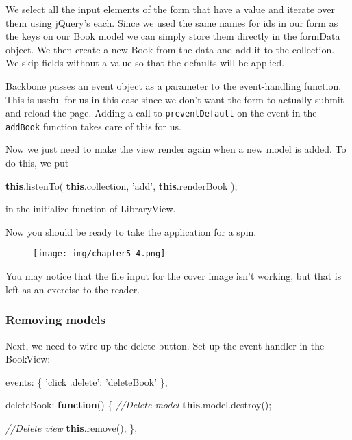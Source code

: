\documentclass[9pt]{book}
\newenvironment{Shaded}{}{}
\newcommand{\KeywordTok}[1]{\textcolor[rgb]{0.00,0.44,0.13}{\textbf{{#1}}}}
\newcommand{\StringTok}[1]{\textcolor[rgb]{0.25,0.44,0.63}{{#1}}}
\newcommand{\CommentTok}[1]{\textcolor[rgb]{0.38,0.63,0.69}{\textit{{#1}}}}
\newcommand{\OtherTok}[1]{\textcolor[rgb]{0.00,0.44,0.13}{{#1}}}
\newcommand{\FunctionTok}[1]{\textcolor[rgb]{0.02,0.16,0.49}{{#1}}}
\newcommand{\NormalTok}[1]{{#1}}
\begin{document}
We select all the input elements of the form that have a value and
iterate over them using jQuery's each. Since we used the same names for
ids in our form as the keys on our Book model we can simply store them
directly in the formData object. We then create a new Book from the data
and add it to the collection. We skip fields without a value so that the
defaults will be applied.

Backbone passes an event object as a parameter to the event-handling
function. This is useful for us in this case since we don't want the
form to actually submit and reload the page. Adding a call to
\texttt{preventDefault} on the event in the \texttt{addBook} function
takes care of this for us.

Now we just need to make the view render again when a new model is
added. To do this, we put

\begin{Shaded}
\begin{Highlighting}[]
\KeywordTok{this}\NormalTok{.}\FunctionTok{listenTo}\NormalTok{( }\KeywordTok{this}\NormalTok{.}\FunctionTok{collection}\NormalTok{, }\StringTok{'add'}\NormalTok{, }\KeywordTok{this}\NormalTok{.}\FunctionTok{renderBook} \NormalTok{);}
\end{Highlighting}
\end{Shaded}

in the initialize function of LibraryView.

Now you should be ready to take the application for a spin.

\begin{figure}[htbp]
\centering
\texttt{[image: img/chapter5-4.png]}
\end{figure}

You may notice that the file input for the cover image isn't working,
but that is left as an exercise to the reader.

\subsubsection{Removing models}\label{removing-models}

Next, we need to wire up the delete button. Set up the event handler in
the BookView:

\begin{Shaded}
\begin{Highlighting}[]
    \NormalTok{events: \{}
        \StringTok{'click .delete'}\NormalTok{: }\StringTok{'deleteBook'}
    \NormalTok{\},}

    \NormalTok{deleteBook: }\KeywordTok{function}\NormalTok{() \{}
        \CommentTok{//Delete model}
        \KeywordTok{this}\NormalTok{.}\OtherTok{model}\NormalTok{.}\FunctionTok{destroy}\NormalTok{();}

        \CommentTok{//Delete view}
        \KeywordTok{this}\NormalTok{.}\FunctionTok{remove}\NormalTok{();}
    \NormalTok{\},}
\end{Highlighting}
\end{Shaded}
\end{document}
